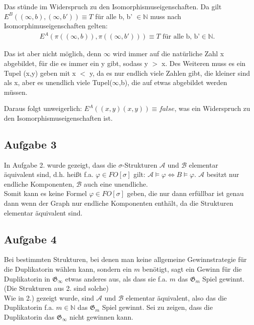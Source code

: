 \documentclass[a4paper,10pt]{article}
\newcommand{\N}{\mathbb{N}}
\begin{document}
	Das stünde im Widerspruch zu den Isomorphismuseigenschaften.
	Da gilt $E^B((\infty, b),(\infty, b')) \equiv T$ für alle b, b' $\in \mathbb{N}$ muss nach Isomorphimuseigenschaften gelten:
	\begin{align*}
		E^A(\pi((\infty, b)),\pi((\infty, b'))) \equiv T \text{ für alle b, b'} \in \mathbb{N}. 
	\end{align*}
	
	Das ist aber nicht möglich, denn $\infty$ wird immer auf die natürliche Zahl x abgebildet, für die es immer ein y gibt, sodass y $>$ x. 
	Des Weiteren muss es ein Tupel (x,y) geben mit x $<$ y, da es nur endlich viele Zahlen gibt, die kleiner sind als x, aber es unendlich viele 			Tupel($\infty$,b), die auf etwas abgebildet werden müssen.
	
	Daraus folgt unweigerlich:
	$E^A((x,y)(x,y)) \equiv false$, was ein Widerspruch zu den Isomorphismuseigenschaften ist.
	
	
\subsection*{Aufgabe 3}
In Aufgabe 2. wurde gezeigt, dass die $\sigma$-Strukturen $\mathcal{A}$ und $\mathcal{B}$ elementar äquivalent sind, d.h. heißt f.a. $\varphi \in FO[\sigma]$ gilt: $\mathcal{A} \vDash \varphi \Leftrightarrow B \vDash \varphi$. $\mathcal{A}$ besitzt nur endliche Komponenten, $\mathcal{B}$ auch eine unendliche. \\Somit kann es keine Formel $\varphi \in FO[\sigma]$ geben, die nur dann erfüllbar ist genau dann wenn der Graph nur endliche Komponenten enthält, da die Strukturen elementar äquivalent sind.


\subsection*{Aufgabe 4}

Bei bestimmten Strukturen, bei denen man keine allgemeine Gewinnstrategie für die Duplikatorin wählen kann, sondern ein $m$ benötigt, sagt ein Gewinn für die Duplikatorin in $\mathfrak{G}_{\infty}$ etwas anderes aus, als dass sie f.a. $m $ das $\mathfrak{G}_m$ Spiel gewinnt. (Die Strukturen aus 2. sind solche) \\

Wie in 2.) gezeigt wurde, sind $\mathcal{A}$ und $\mathcal{B}$ elementar äquivalent, also das die Duplikatorin f.a. $m \in \N$ das $\mathfrak{G}_m$ Spiel gewinnt.
Sei zu zeigen, dass die Duplikatorin das $\mathfrak{G}_{\infty}$ nicht gewinnen kann. \\
\end{document}

